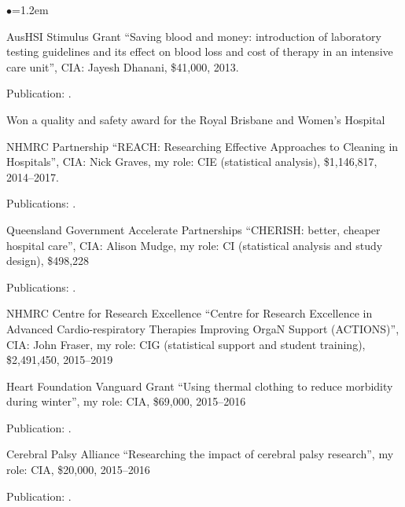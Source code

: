 \documentclass[a4paper,11pt]{article}
\renewcommand{\labelitemi}{$\bullet$}
\begin{document}
\begin{raggedright}
\begin{list}{\labelitemi}{\leftmargin=1.2em}
\item AusHSI Stimulus Grant ``Saving blood and money: introduction of laboratory testing guidelines and its effect on blood loss and cost of therapy in an intensive care unit'', CIA: Jayesh Dhanani, \$41,000, 2013.

Publication: .

Won a quality and safety award for the Royal Brisbane and Women's Hospital

\item NHMRC Partnership ``REACH: Researching Effective Approaches to Cleaning in Hospitals'', CIA: Nick Graves, my role: CIE (statistical analysis), \$1,146,817, 2014--2017.

    Publications: .

\item Queensland Government Accelerate Partnerships ``CHERISH: better, cheaper hospital care'', CIA: Alison Mudge, my role: CI (statistical analysis and study design), \$498,228 %

    Publications: .

\item NHMRC Centre for Research Excellence ``Centre for Research Excellence in Advanced Cardio-respiratory Therapies Improving OrgaN Support (ACTIONS)'', CIA: John Fraser, my role: CIG (statistical support and student training), \$2,491,450, 2015--2019

\item Heart Foundation Vanguard Grant ``Using thermal clothing to reduce morbidity during winter'', my role: CIA, \$69,000, 2015--2016

   Publication: .

\item Cerebral Palsy Alliance ``Researching the impact of cerebral palsy research'', my role: CIA, \$20,000, 2015--2016

   Publication: .


\end{list}
\end{raggedright}
\end{document}
